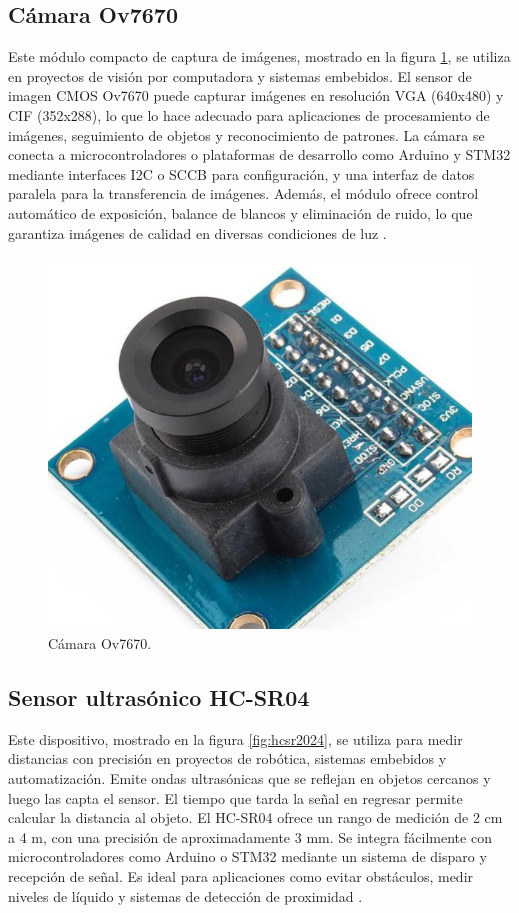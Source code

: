 \subsection{Cámara Ov7670}
\label{subsec:camara}

Este módulo compacto de captura de imágenes, mostrado en la figura \ref{fig:camara2024}, se utiliza en proyectos de visión por computadora y sistemas embebidos. El sensor de imagen CMOS Ov7670 puede capturar imágenes en resolución VGA (640x480) y CIF (352x288), lo que lo hace adecuado para aplicaciones de procesamiento de imágenes, seguimiento de objetos y reconocimiento de patrones. La cámara se conecta a microcontroladores o plataformas de desarrollo como Arduino y STM32 mediante interfaces I2C o SCCB para configuración, y una interfaz de datos paralela para la transferencia de imágenes. Además, el módulo ofrece control automático de exposición, balance de blancos y eliminación de ruido, lo que garantiza imágenes de calidad en diversas condiciones de luz \citep{WEBSITE:camara2024}.

\begin{figure}[htbp]
	\centering
	\includegraphics[width=.5\textwidth]{./Figures/camara.png}
	\caption{Cámara Ov7670\protect\footnotemark.}
	\label{fig:camara2024}
\end{figure}


\subsection{Sensor ultrasónico HC-SR04}
\label{subsec:hcsr04}

Este dispositivo, mostrado en la figura \ref{fig:hcsr2024}, se utiliza para medir distancias con precisión en proyectos de robótica, sistemas embebidos y automatización. Emite ondas ultrasónicas que se reflejan en objetos cercanos y luego las capta el sensor. El tiempo que tarda la señal en regresar permite calcular la distancia al objeto. El HC-SR04 ofrece un rango de medición de 2 cm a 4 m, con una precisión de aproximadamente 3 mm. Se integra fácilmente con microcontroladores como Arduino o STM32 mediante un sistema de disparo y recepción de señal. Es ideal para aplicaciones como evitar obstáculos, medir niveles de líquido y sistemas de detección de proximidad \citep{WEBSITE:hcsr2024}.

